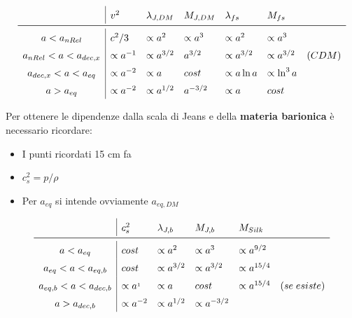 \begin{equation}\left.
    \def\arraystretch{1.5}
        \begin{array}{c|llllll}
         & v^2 & \lambda_{J,DM} & M_{J,DM} & \lambda_{fs}& M_{fs} & \\ \midrule
        a < a_{nRel} & c^2/3 & \propto a^2  & \propto a^3 & \propto a^2 & \propto a^3  & \\
        a_{nRel}< a < a_{dec,x} & \propto a^{-1} & \propto a^{3/2} &  a^{3/2} & \propto a^{3/2} & \propto a^{3/2} & (CDM) \\
        a_{dec,x}< a < a_{eq} & \propto a^{-2}  & \propto a & cost & \propto a\ln a & \propto \ln^3 a& \\
        a > a_{eq} & \propto a^{-2} & \propto a^{1/2} &  a^{-3/2} &\propto a  & cost &
    \end{array}\right. \label{tab:7jfsdm}
\end{equation}

\vspace{2em}
Per ottenere le dipendenze dalla scala di Jeans e della \textbf{materia barionica} è necessario ricordare:
\begin{itemize}
    \item I punti ricordati 15 cm fa
    \item $c_s^2=p/\rho$
    \item Per $a_{eq}$ si intende ovviamente $a_{eq,DM}$
\end{itemize}
\begin{equation}\left.
    \def\arraystretch{1.5}
        \begin{array}{c|lllll}
             & c_s^2 & \lambda_{J,b} & M_{J,b} & M_{Silk} & \\ \midrule
        a<a_{eq} & cost & \propto a^2 & \propto a^3 & \propto a^{9/2} &\\
        a_{eq} < a<a_{eq,b} & cost &  \propto a^{3/2} & \propto a^{3/2} & \propto a^{15/4} & \\
        a_{eq,b} < a < a_{dec,b} & \propto a^{_1} & \propto a & cost & \propto a^{15/4} & (se\; esiste) \\
        a > a_{dec,b} & \propto a^{-2} & \propto a^{1/2} & \propto a^{-3/2} & &
    \end{array}\right.  \label{tab:7jbar}
\end{equation}